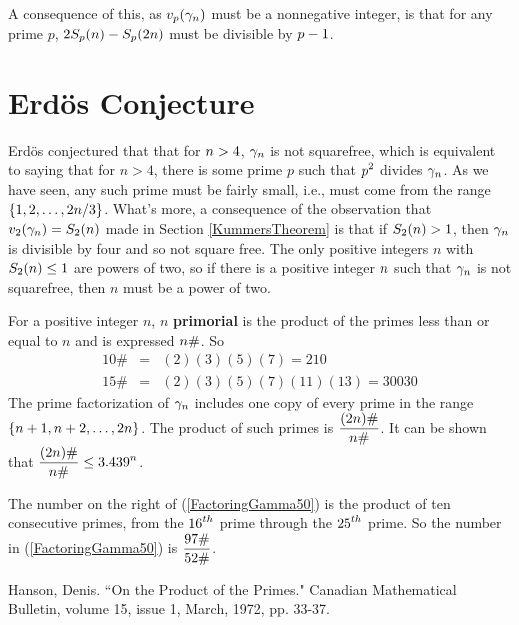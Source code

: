 A consequence of this, as $\displaystyle v_p(\gamma_n)$ must be a nonnegative integer, is that for any prime $p$, $\displaystyle 2 S_p(n) - S_p(2n)$ must be divisible by $\displaystyle p-1$.





\section*{Erd\"{o}s Conjecture}

Erd\"{o}s conjectured that that for $\displaystyle n>4$, $\displaystyle \gamma_n$ is not squarefree, which is equivalent to saying that for $n>4$, there is some prime $p$ such that $\displaystyle p^2$ divides $\displaystyle \gamma_n$. As we have seen, any such prime must be fairly small, i.e., must come from the range $\displaystyle \left\{ 1,2,\ldots, 2n/3\right\}$. What's more, a consequence of the observation that $\displaystyle v_2(\gamma_n) = S_2(n)$ made in Section \ref{KummersTheorem} is that if $\displaystyle S_2(n)>1$, then $\displaystyle \gamma_n$ is divisible by four and so not square free. The only positive integers $n$ with $\displaystyle S_2(n)\leq 1$ are powers of two, so if there is a positive integer $\displaystyle n$ such that $\displaystyle \gamma_n$ is not squarefree, then $n$ must be a power of two.

For a positive integer $n$, $n$ \textbf{primorial} is the product of the primes less than or equal to $n$ and is expressed $\displaystyle n\# $. So
\begin{eqnarray*}
 10\# & = & (2)(3)(5)(7) = 210 \\
 15 \# & = & (2)(3)(5)(7)(11)(13) = 30030
\end{eqnarray*}
The prime factorization of $\displaystyle \gamma_n$ includes one copy of every prime in the range $\displaystyle \left\{ n+1, n+2, \ldots, 2n\right\}$. The product of such primes is $\displaystyle \frac{(2n)\#}{n \#}$. It can be shown that $\displaystyle \frac{(2n)\#}{n \#} \leq 3.439^n$.



The number on the right of (\ref{FactoringGamma50}) is the product of ten consecutive primes, from the $\displaystyle 16^{th}$ prime through the $\displaystyle 25^{th}$ prime. 
So the number in (\ref{FactoringGamma50}) is $\displaystyle \frac{97 \#}{52 \#}$.



\begin{thebibliography}{99} 

 Hanson, Denis. ``On the Product of the Primes." Canadian Mathematical Bulletin, volume 15, issue 1, March, 1972, pp. 33-37.

\end{thebibliography}
\fi



